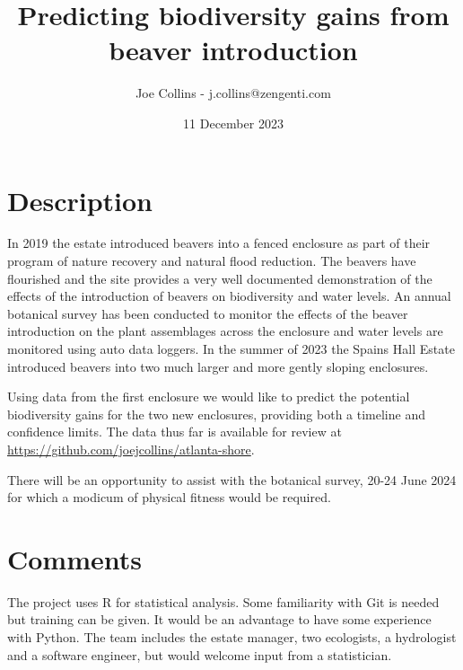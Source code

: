 \documentclass{./roles}
\title{Predicting biodiversity gains from beaver introduction}
\author{Joe Collins - j.collins@zengenti.com}
\date{11 December 2023}
\begin{document}
\maketitle

\section*{Description}

In 2019 the estate introduced beavers into a fenced enclosure
as part of their program of nature recovery and natural flood reduction.
The beavers have flourished and the site provides a very well documented demonstration
of the effects of the introduction of beavers on biodiversity and water levels.
An annual botanical survey has been conducted to monitor the effects of the beaver introduction
on the plant assemblages across the enclosure and water levels are monitored using auto data loggers.
In the summer of 2023 the Spains Hall Estate introduced beavers into two much larger
and more gently sloping enclosures.

Using data from the first enclosure we would like to predict the potential biodiversity gains for the two new enclosures,
providing both a timeline and confidence limits.
The data thus far is available for review at
\href{https://github.com/joejcollins/atlanta-shore}{https://github.com/joejcollins/atlanta-shore}. 

There will be an opportunity to assist with the botanical survey,
20-24 June 2024 for which a modicum of physical fitness would be required.

\section*{Comments}

The project uses R for statistical analysis.
Some familiarity with Git is needed but training can be given.
It would be an advantage to have some experience with Python.
The team includes the estate manager, two ecologists, a hydrologist and a software engineer,
but would welcome input from a statistician.
\end{document}
